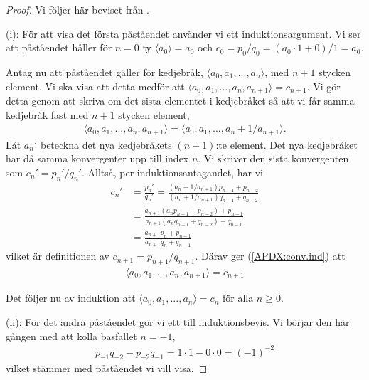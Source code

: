 \begin{proof}
    Vi följer här beviset från \cite{Lindahl}.
    
    (i): För att visa det första påståendet använder vi ett induktionsargument. 
    Vi ser att påståendet håller för $n = 0$ ty \(\langle a_0 \rangle = a_0\) och \(c_0 = p_0 / q_0 = (a_0 \cdot 1 + 0) / 1 = a_0\).
    
    Antag nu att påståendet gäller för kedjebråk, \(\langle a_0, a_1, ..., a_n \rangle\), med $n + 1$ stycken element. Vi ska visa att detta medför att \(\langle a_0, a_1, ..., a_n, a_{n+1} \rangle = c_{n+1}\). Vi gör detta genom att skriva om det sista elementet i kedjebråket så att vi får samma kedjebråk fast med $n + 1$ stycken element,
    \begin{align} \label{APDX:conv.ind}
        \langle a_0, a_1, ..., a_n, a_{n+1} \rangle = \langle a_0, a_1, ..., a_n + 1 / a_{n+1} \rangle .
    \end{align}
    Låt $a_n'$ beteckna det nya kedjebråkets $(n+1)$:te element. Det nya kedjebråket har då samma konvergenter upp till index $n$. Vi skriver den sista konvergenten som $c_n' = p_n'/q_n'$. Alltså, per induktionsantagandet, har vi
    \begin{align*}
        c_{n}' &= \frac{p_n'}{q_n'} = \frac{\left( a_{n} + 1/a_{n+1} \right) p_{n-1} + p_{n-2}}{\left( a_{n} + 1/a_{n+1} \right) q_{n-1} + q_{n-2}} \\
        &= \frac{ a_{n+1} \left( a_{n} p_{n-1} + p_{n-2} \right) + p_{n-1}}{a_{n+1} \left( a_{n} q_{n-1} + q_{n-2} \right) + q_{n-1}}\\
        &= \frac{ a_{n+1} p_n + p_{n-1}}{a_{n+1} q_n + q_{n-1}} 
    \end{align*}
    vilket är definitionen av \(c_{n+1} = p_{n+1}/q_{n+1}\). Därav ger (\ref{APDX:conv.ind}) att
    \begin{align*}
        \langle a_0, a_1, ..., a_n, a_{n+1} \rangle = c_{n+1}
    \end{align*}
    
    Det följer nu av induktion att \(\langle a_0, a_1, ..., a_n \rangle = c_n\) för alla \(n \geq 0\).
    
    (ii): För det andra påståendet gör vi ett till induktionsbevis. Vi börjar den här gången med att kolla basfallet $n = -1$,
    \begin{align*}
        p_{-1} q_{-2} - p_{-2} q_{-1} = 1 \cdot 1 - 0 \cdot 0 = (-1)^{-2} 
    \end{align*}
    vilket stämmer med påståendet vi vill visa. 
    

\end{proof}
